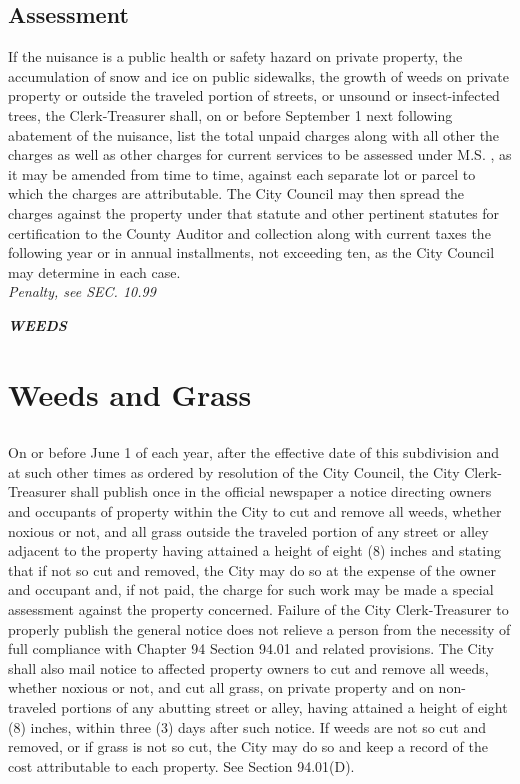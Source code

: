 \documentclass[code.tex]{subfiles}
\begin{document}
\subsection{Assessment}
If the nuisance is a public health or safety hazard on private property, the accumulation of snow and ice on public sidewalks, the growth of weeds on private property or outside the traveled portion of streets, or unsound or insect-infected trees, the Clerk-Treasurer shall, on or before September 1 next following abatement of the nuisance, list the total unpaid charges along with all other the charges as well as other charges for current services to be assessed under M.S. , as it may be amended from time to time, against each separate lot or parcel to which the charges are attributable.  The City Council may then spread the charges against the property under that statute and other pertinent statutes for certification to the County Auditor and collection along with current taxes the following year or in annual installments, not exceeding ten, as the City Council may determine in each case.\\
\emph{Penalty, see SEC. 10.99}

\begin{center}
\emph{\textbf{\LARGE{WEEDS}}}
\end{center}
\setcounter{section}{34}
\section{Weeds and Grass}
\subsection{}
On or before June 1 of each year, after the effective date of this subdivision and at such other times as ordered by resolution of the City Council, the City Clerk-Treasurer shall publish once in the official newspaper a notice directing owners and occupants of property within the City to cut and remove all weeds, whether noxious or not, and all grass outside the traveled portion of any street or alley adjacent to the property having attained a height of eight (8) inches and stating that if not so cut and removed, the City may do so at the expense of the owner and occupant and, if not paid, the charge for such work may be made a special assessment against the property concerned. Failure of the City Clerk-Treasurer to properly publish the general notice does not relieve a person from the necessity of full compliance with Chapter 94 Section 94.01 and related provisions. The City shall also mail notice to affected property owners to cut and remove all weeds, whether noxious or not, and cut all grass, on private property and on non-traveled portions of any abutting street or alley, having attained a height of eight (8) inches, within three (3) days after such notice.  If weeds are not so cut and removed, or if grass is not so cut, the City may do so and keep a record of the cost attributable to each property. See Section 94.01(D).
\end{document}
